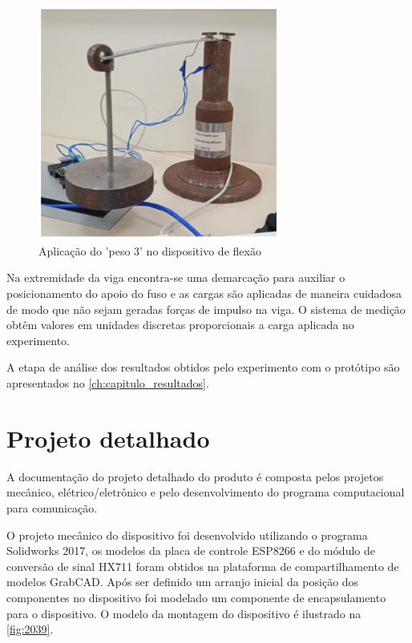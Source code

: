\begin{figure}[H]
	\caption{\label{fig:2080} Aplicação do 'peso 3' no dispositivo de flexão}
	\begin{center}
		\includegraphics[width=300]{pictures/2080.png}
	\end{center}
\end{figure}

Na extremidade da viga encontra-se uma demarcação para auxiliar o posicionamento do apoio do fuso e as cargas são aplicadas de maneira cuidadosa de modo que não sejam geradas forças de
impulso na viga.
O sistema de medição obtêm valores em unidades discretas proporcionais a carga aplicada no experimento.

A etapa de análise dos resultados obtidos pelo experimento com o protótipo são apresentados no \autoref{ch:capitulo_resultados}.

\section{Projeto detalhado}

A documentação do projeto detalhado do produto é composta pelos projetos mecânico, elétrico/eletrônico e pelo desenvolvimento do programa computacional para comunicação.

O projeto mecânico do dispositivo foi desenvolvido utilizando o programa Solidworks 2017, os modelos da placa de controle ESP8266 e do módulo de conversão de sinal HX711
foram obtidos na plataforma de compartilhamento de modelos GrabCAD. Após ser definido um arranjo inicial da posição dos componentes no dispositivo foi modelado um
componente de encapsulamento para o dispositivo.
O modelo da montagem do dispositivo é ilustrado na \autoref{fig:2039}.

